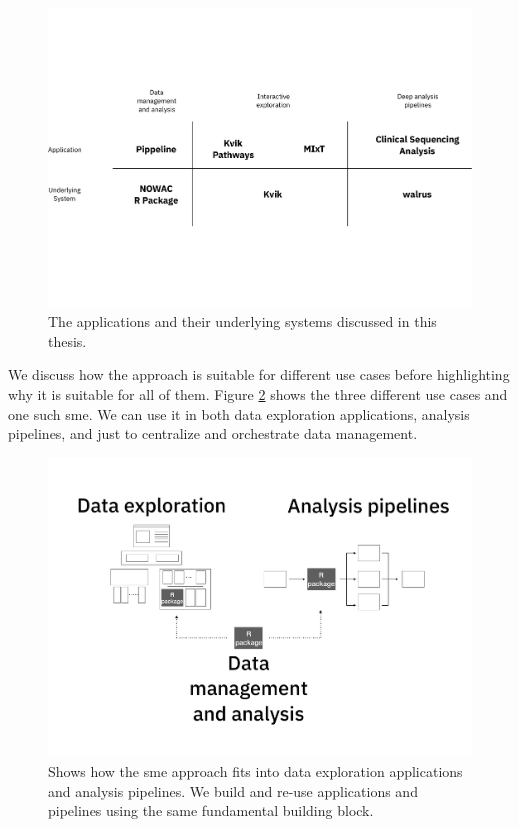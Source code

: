 \begin{figure}
\includegraphics[width=\textwidth]{figures/overall-arch.pdf}
    \caption{The applications and their underlying systems discussed in this
    thesis.} 
    \label{overview-fig}
\end{figure} 


We discuss how the approach is suitable for different use cases before
highlighting why it is suitable for all of them. Figure \ref{overview-full}
shows the three different use cases and one such \gls{sme}. We can use it in
both data exploration applications, analysis pipelines, and just to centralize
and orchestrate data management. 

\begin{figure}
\includegraphics[width=\textwidth]{figures/overview-full.pdf}
    \caption{Shows how the \gls{sme} approach fits into data exploration
    applications and analysis pipelines. We build and re-use applications and
    pipelines using the same fundamental building block.} 
    \label{overview-full}
\end{figure} 

